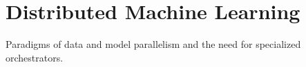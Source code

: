 \section{Distributed Machine Learning}

Paradigms of data and model parallelism and the need for specialized orchestrators.
